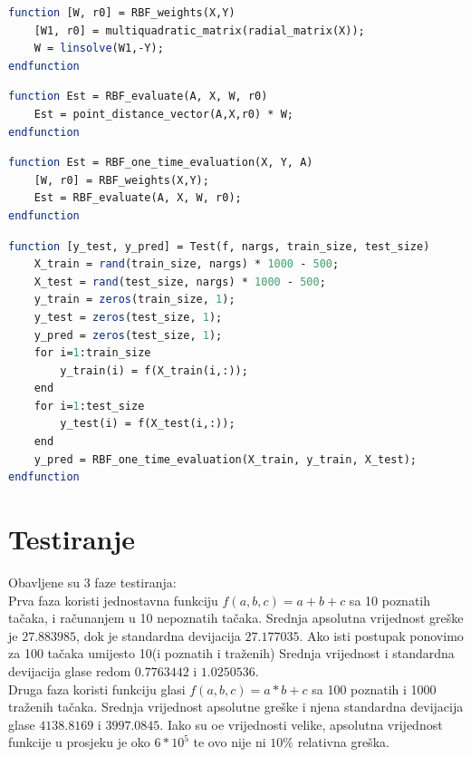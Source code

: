 \documentclass[12pt, a4paper]{report}
\theoremstyle{definition}
\begin{document}
\begin{lstlisting}[language=Scilab]
function [W, r0] = RBF_weights(X,Y)
    [W1, r0] = multiquadratic_matrix(radial_matrix(X));
    W = linsolve(W1,-Y);
endfunction
\end{lstlisting}
			
\begin{lstlisting}[language=Scilab]
function Est = RBF_evaluate(A, X, W, r0)
    Est = point_distance_vector(A,X,r0) * W;
endfunction	
\end{lstlisting}

\begin{lstlisting}[language=Scilab]
function Est = RBF_one_time_evaluation(X, Y, A)
    [W, r0] = RBF_weights(X,Y);
    Est = RBF_evaluate(A, X, W, r0);
endfunction
\end{lstlisting}
			
\begin{lstlisting}[language=Scilab]
function [y_test, y_pred] = Test(f, nargs, train_size, test_size)
    X_train = rand(train_size, nargs) * 1000 - 500;
    X_test = rand(test_size, nargs) * 1000 - 500;
    y_train = zeros(train_size, 1);
    y_test = zeros(test_size, 1);
    y_pred = zeros(test_size, 1);
    for i=1:train_size
        y_train(i) = f(X_train(i,:));
    end
    for i=1:test_size
        y_test(i) = f(X_test(i,:));
    end    
    y_pred = RBF_one_time_evaluation(X_train, y_train, X_test);
endfunction
\end{lstlisting}
		
	\section*{Testiranje}
	
	Obavljene su 3 faze testiranja:\\
	
	Prva faza koristi jednostavna funkciju $f(a,b,c)=a+b+c$ sa 10 poznatih tačaka, i računanjem u 10 nepoznatih tačaka. Srednja apsolutna vrijednost greške je $27.883985$, dok je standardna devijacija $27.177035$. Ako isti postupak ponovimo za 100 tačaka umijesto 10(i poznatih i traženih) Srednja vrijednost i standardna devijacija glase redom $0.7763442$ i $1.0250536$.\\
	
	Druga faza koristi funkciju glasi $f(a,b,c)=a*b+c$ sa 100 poznatih i 1000 traženih tačaka. Srednja vrijednost apsolutne greške i njena standardna devijacija glase $4138.8169$ i $3997.0845$. Iako su oe vrijednosti velike, apsolutna vrijednost funkcije u prosjeku je oko $6*10^5$ te ovo nije ni $10\%$ relativna greška.\\
	
\end{document}
